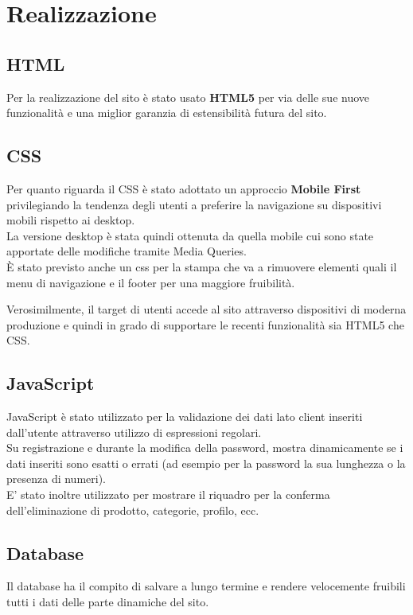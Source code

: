 \documentclass[a4paper, 11pt]{article}
\begin{document}
\pagebreak

\section{Realizzazione}

\subsection{HTML}
Per la realizzazione del sito è stato usato \textbf{HTML5} per via delle sue nuove funzionalità e una miglior garanzia di estensibilità futura del sito.

\subsection{CSS}
Per quanto riguarda il CSS è stato adottato un approccio \textbf{Mobile First} privilegiando la tendenza degli utenti a preferire la navigazione su dispositivi mobili rispetto ai desktop. \\
La versione desktop è stata quindi ottenuta da quella mobile cui sono state apportate delle modifiche tramite Media Queries. \\
È stato previsto anche un css per la stampa che va a rimuovere elementi quali il menu di navigazione e il footer per una maggiore fruibilità.

Verosimilmente, il target di utenti accede al sito attraverso dispositivi di moderna produzione e quindi in grado di supportare le recenti funzionalità sia HTML5 che CSS.

\subsection{JavaScript}
JavaScript è stato utilizzato per la validazione dei dati lato client inseriti dall’utente attraverso utilizzo di espressioni regolari.\\
Su registrazione e durante la modifica della password, mostra dinamicamente se i dati inseriti sono esatti o errati (ad esempio per la password la sua lunghezza o la presenza di numeri). \\
E’ stato inoltre utilizzato per mostrare il riquadro per la conferma dell’eliminazione di prodotto, categorie, profilo, ecc. \\


\subsection{Database}
Il database ha il compito di salvare a lungo termine e rendere velocemente fruibili tutti i dati delle parte dinamiche del sito. 
\end{document}
